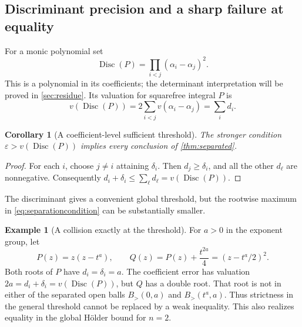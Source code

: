 \documentclass[11pt,letterpaper]{article}
\numberwithin{equation}{section}
\newtheorem{corollary}[theorem]{Corollary}
\theoremstyle{definition}
\newtheorem{example}[theorem]{Example}
\theoremstyle{remark}\newtheorem{remark}[theorem]{Remark}
\newcommand{\Disc}{\operatorname{Disc}}
\newcommand{\Bgt}[2]{B_{>}(#1,#2)}
\begin{document}
\subsection{Discriminant precision and a sharp failure at equality}
For a monic polynomial set
\[
 \Disc(P)=\prod_{i<j}(\alpha_i-\alpha_j)^2.
\]
This is a polynomial in its coefficients; the determinant interpretation
will be proved in \cref{sec:residue}. Its valuation for squarefree integral
$P$ is
\begin{equation}\label{eq:discvaluation}
 v(\Disc(P))=2\sum_{i<j}v(\alpha_i-\alpha_j)=\sum_i d_i.
\end{equation}

\begin{corollary}[A coefficient-level sufficient threshold]
\label{cor:discthreshold}
The stronger condition $\varepsilon>v(\Disc(P))$ implies every
conclusion of \cref{thm:separated}.
\end{corollary}
\begin{proof}
For each $i$, choose $j\ne i$ attaining $\delta_i$. Then
$d_j\ge\delta_i$, and all the other $d_\ell$ are nonnegative.
Consequently $d_i+\delta_i\le\sum_\ell d_\ell=v(\Disc(P))$.
\end{proof}
The discriminant gives a convenient global threshold, but the rootwise
maximum in \eqref{eq:separationcondition} can be substantially smaller.

\begin{example}[A collision exactly at the threshold]\label{ex:threshold}
For $a>0$ in the exponent group, let
\[
 P(z)=z(z-t^a),\qquad
 Q(z)=P(z)+\frac{t^{2a}}4=(z-t^a/2)^2.
\]
Both roots of $P$ have $d_i=\delta_i=a$. The coefficient error has
valuation $2a=d_i+\delta_i=v(\Disc(P))$, but $Q$ has a double root.
That root is not in either of the separated open balls
$\Bgt0a$ and $\Bgt{t^a}a$. Thus strictness in the general threshold
cannot be replaced by a weak inequality. This also realizes equality
in the global H\"older bound for $n=2$.
\end{example}
\end{document}
